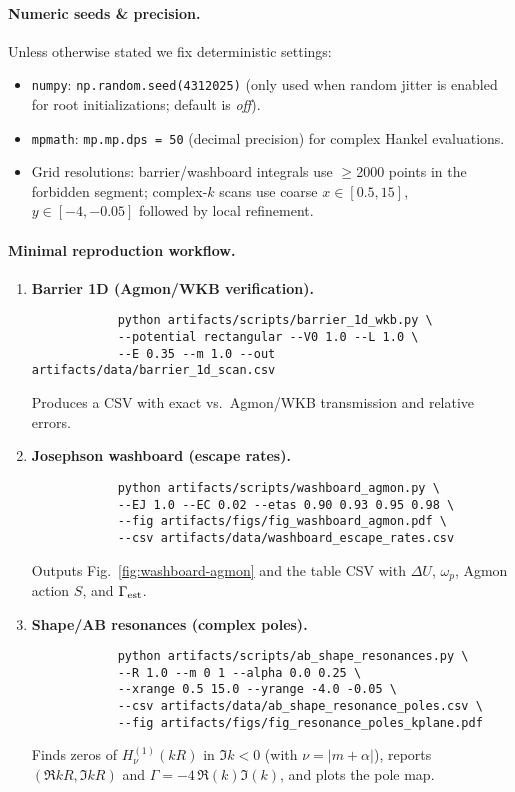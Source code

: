 \documentclass[11pt]{article}
\theoremstyle{definition}
\begin{document}
    \paragraph{Numeric seeds \& precision.}
    Unless otherwise stated we fix deterministic settings:
    \begin{itemize}
    	\item \texttt{numpy}: \texttt{np.random.seed(4312025)} (only used when random jitter is enabled for root initializations; default is \emph{off}).
    	\item \texttt{mpmath}: \texttt{mp.mp.dps = 50} (decimal precision) for complex Hankel evaluations.
    	\item Grid resolutions: barrier/washboard integrals use $\ge$2000 points in the forbidden segment; complex-$k$ scans use coarse $x\in[0.5,15]$, $y\in[-4,-0.05]$ followed by local refinement.
    \end{itemize}
    
    \paragraph{Minimal reproduction workflow.}
    \begin{enumerate}
    	\item \textbf{Barrier 1D (Agmon/WKB verification).}
    	\begin{verbatim}
    		python artifacts/scripts/barrier_1d_wkb.py \
    		--potential rectangular --V0 1.0 --L 1.0 \
    		--E 0.35 --m 1.0 --out artifacts/data/barrier_1d_scan.csv
    	\end{verbatim}
    	Produces a CSV with exact vs.\ Agmon/WKB transmission and relative errors.
    	
    	\item \textbf{Josephson washboard (escape rates).}
    	\begin{verbatim}
    		python artifacts/scripts/washboard_agmon.py \
    		--EJ 1.0 --EC 0.02 --etas 0.90 0.93 0.95 0.98 \
    		--fig artifacts/figs/fig_washboard_agmon.pdf \
    		--csv artifacts/data/washboard_escape_rates.csv
    	\end{verbatim}
    	Outputs Fig.~\ref{fig:washboard-agmon} and the table CSV with
    	$\Delta U$, $\omega_p$, Agmon action $S$, and $\Gamma_{\rm est}$.
    	
    	\item \textbf{Shape/AB resonances (complex poles).}
    	\begin{verbatim}
    		python artifacts/scripts/ab_shape_resonances.py \
    		--R 1.0 --m 0 1 --alpha 0.0 0.25 \
    		--xrange 0.5 15.0 --yrange -4.0 -0.05 \
    		--csv artifacts/data/ab_shape_resonance_poles.csv \
    		--fig artifacts/figs/fig_resonance_poles_kplane.pdf
    	\end{verbatim}
    	Finds zeros of $H^{(1)}_{\nu}(kR)$ in $\Im k<0$ (with $\nu=|m+\alpha|$), 
    	reports $(\Re kR,\Im kR)$ and $\Gamma=-4\,\Re(k)\Im(k)$, and plots the pole map.
    \end{enumerate}
    
\end{document}
